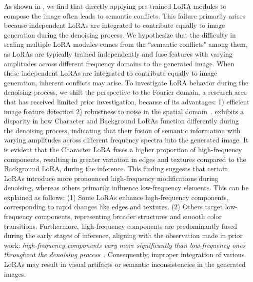 As shown in , we find that directly applying pre-trained LoRA modules to compose the image often leads to semantic conflicts. This failure primarily arises because independent LoRAs are integrated to contribute equally to image generation during the denoising process. We hypothesize that the difficulty in scaling multiple LoRA modules comes from the ``semantic conflicts" among them, as LoRAs are typically trained independently and fuse features with varying amplitudes across different frequency domains to the generated image. When these independent LoRAs are integrated to contribute equally to image generation, inherent conflicts may arise. To investigate LoRA behavior during the denoising process, we shift the perspective to the Fourier domain, a research area that has received limited prior investigation, because of its advantages: 1) efficient image feature detection 2) robustness to noise in the spatial domain~\citep{freq1}.  exhibits a disparity in how Character and Background LoRAs function differently during the denoising process, indicating that their fusion of semantic information with varying amplitudes across different frequency spectra into the generated image. It is evident that the Character LoRA fuses a higher proportion of high-frequency components, resulting in greater variation in edges and textures compared to the Background LoRA, during the inference. This finding suggests that certain LoRAs introduce more pronounced high-frequency modifications during denoising, whereas others primarily influence low-frequency elements. This can be explained as follows: (1) Some LoRAs enhance high-frequency components, corresponding to rapid changes like edges and textures. (2) Others target low-frequency components, representing broader structures and smooth color transitions. Furthermore, high-frequency components are predominantly fused during the early stages of inference, aligning with the observation made in prior work: \textit{high-frequency components vary more significantly than low-frequency ones throughout the denoising process}~\citep{freeu}. Consequently, improper integration of various LoRAs may result in visual artifacts or semantic inconsistencies in the generated images.

\vspace{-3pt}

